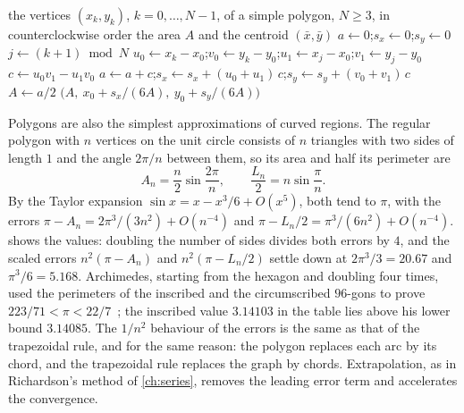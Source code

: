 \begin{algorithm}
\begin{algorithmic}[1]
\Require the vertices $(x_k,y_k)$, $k=0,\ldots,N-1$, of a simple polygon, $N\ge3$, in counterclockwise order
\Ensure the area $A$ and the centroid $(\bar x,\bar y)$
\State $a\gets0$;\quad $s_x\gets0$;\quad $s_y\gets0$
  \State $j\gets(k+1)\bmod N$
  \State $u_0\gets x_k-x_0$;\quad $v_0\gets y_k-y_0$;\quad $u_1\gets x_j-x_0$;\quad $v_1\gets y_j-y_0$ 
  \State $c\gets u_0v_1-u_1v_0$ 
  \State $a\gets a+c$;\quad $s_x\gets s_x+(u_0+u_1)\,c$;\quad $s_y\gets s_y+(v_0+v_1)\,c$
\EndFor
\State $A\gets a/2$
\State \Return $\bigl(A,\ x_0+s_x/(6A),\ y_0+s_y/(6A)\bigr)$
\end{algorithmic}
\caption{Area and centroid of a simple polygon by the shoelace formula and \cref{prop:polygon-centroid}, after translating the first vertex to the origin. The cost is $O(N)$. For vertices in clockwise order, $A$ comes out negative and the centroid is still correct.}
\label{alg:polygon}
\end{algorithm}

Polygons are also the simplest approximations of curved regions. The regular polygon with $n$ vertices on the unit circle consists of $n$ triangles with two sides of length $1$ and the angle $2\pi/n$ between them, so its area and half its perimeter are
\[
A_n=\frac n2\sin\frac{2\pi}n ,\qquad\frac{L_n}2=n\sin\frac\pi n .
\]
By the Taylor expansion $\sin x=x-x^3/6+O(x^5)$, both tend to $\pi$, with the errors $\pi-A_n=2\pi^3/(3n^2)+O(n^{-4})$ and $\pi-L_n/2=\pi^3/(6n^2)+O(n^{-4})$.  shows the values: doubling the number of sides divides both errors by $4$, and the scaled errors $n^2(\pi-A_n)$ and $n^2(\pi-L_n/2)$ settle down at $2\pi^3/3=20.67$ and $\pi^3/6=5.168$. Archimedes, starting from the hexagon and doubling four times, used the perimeters of the inscribed and the circumscribed $96$-gons to prove $223/71<\pi<22/7$~\cite{heath1897archimedes}; the inscribed value $3.14103$ in the table lies above his lower bound $3.14085$. The $1/n^2$ behaviour of the errors is the same as that of the trapezoidal rule, and for the same reason: the polygon replaces each arc by its chord, and the trapezoidal rule replaces the graph by chords. Extrapolation, as in Richardson's method of \cref{ch:series}, removes the leading error term and accelerates the convergence.

